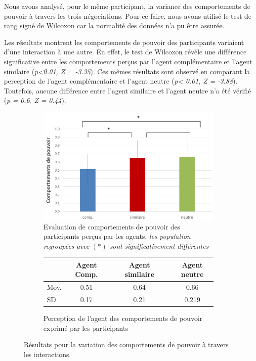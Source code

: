 	Nous avons analysé, pour le même participant, la variance des comportements de pouvoir à travers les trois négociations. Pour ce faire, nous avons utilisé le test de rang signé de Wilcoxon car la normalité des données n'a pu être assurée. 
	
	Les résultats montrent les comportements de pouvoir des participants variaient d'une interaction à une autre. En effet, le test de Wilcoxon révèle une différence significative entre les comportements perçus par l'agent complémentaire et l'agent similaire (\emph{p<0.01, Z = -3.35}). Ces mêmes résultats sont observé en comparant la perception de l'agent complémentaire et l'agent neutre (\emph{p< 0.01, Z = -3.88}).
	Toutefois, aucune différence entre l'agent similaire et l'agent neutre n'a été vérifié (\emph{p = 0.6, Z = 0.44}). 
	
			\begin{figure}[h]
		
		\begin{subfigure}[h]{0.8\textwidth}
			\centering
			\includegraphics[clip=false]{Figures/chap7/pow.png}
			\caption{ Evaluation de comportements de pouvoir des participants perçus par les agents. \textit{les population regroupées avec $(*)$ sont significativement différentes }}
		\end{subfigure}
		
		\begin{subfigure}[h]{0.8\textwidth}
			
			\centering
			\begin{tabular}{ l c c c c c }
				\hline
				\textbf{ }& \textbf{Agent Comp.} & &  \textbf{Agent similaire} & & \textbf{Agent neutre} \\ 
				\hline
				\newline Moy. & 0.51 && 0.64 && 0.66 \\
				\newline SD & 0.17 && 0.21 && 0.219   \\
				\hline
				
			\end{tabular}
			\caption{Perception de l'agent des comportements de pouvoir exprimé par les participants} 
		\end{subfigure}
		\caption{Résultats pour la variation des comportements de pouvoir à travers les interactions.}
		\label{fig:pow}
	\end{figure}

